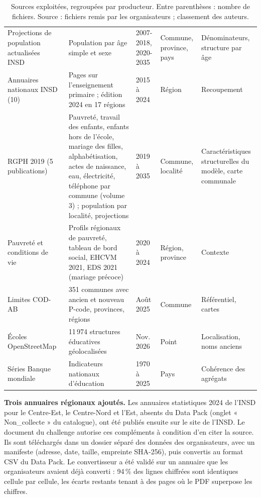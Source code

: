 \documentclass{article}
\begin{document}
\begin{table}[!t]
\begin{tabularx}{\textwidth}{@{}L{3.3cm} Y L{2.6cm} L{2.4cm} L{3.4cm}@{}}
Projections de population actualisées INSD~\cite{insd_projections} & Population par âge simple et sexe & 2007-2018, 2020-2035 & Commune, province, pays & Dénominateurs, structure par âge \\
Annuaires nationaux INSD (10)~\cite{insd_annuaires} & Pages sur l'enseignement primaire ; édition 2024 en 17 régions & 2015 à 2024 & Région & Recoupement \\
RGPH 2019 (5 publications)~\cite{insd_rgph} & Pauvreté, travail des enfants, enfants hors de l'école, mariage des filles, alphabétisation, actes de naissance, eau, électricité, téléphone par commune (volume 3) ; population par localité, projections & 2019 à 2035 & Commune, localité & Caractéristiques structurelles du modèle, carte communale \\
Pauvreté et conditions de vie~\cite{insd_pauvrete,ehcvm2021,eds2021} & Profils régionaux de pauvreté, tableau de bord social, EHCVM 2021, EDS 2021 (mariage précoce) & 2020 à 2024 & Région, province & Contexte \\
Limites COD-AB~\cite{codab} & 351 communes avec ancien et nouveau P-code, provinces, régions & Août 2025 & Commune & Référentiel, cartes \\
Écoles OpenStreetMap~\cite{hotosm} & 11\,974 structures éducatives géolocalisées & Nov. 2026 & Point & Localisation, noms anciens \\
Séries Banque mondiale~\cite{bm_unesco} & Indicateurs nationaux d'éducation & 1970 à 2025 & Pays & Cohérence des agrégats \\
\bottomrule
\end{tabularx}
\caption{Sources exploitées, regroupées par producteur. Entre parenthèses : nombre de fichiers. Source : fichiers remis par les organisateurs ; classement des auteurs.}
\label{tab:sources}
\end{table}

\textbf{Trois annuaires régionaux ajoutés.} Les annuaires statistiques 2024 de l'INSD pour le Centre-Est, le Centre-Nord et l'Est, absents du Data Pack (onglet « Non\_collecte » du catalogue), ont été publiés ensuite sur le site de l'INSD. Le document du challenge autorise ces compléments à condition d'en citer la source. Ils sont téléchargés dans un dossier séparé des données des organisateurs, avec un manifeste (adresse, date, taille, empreinte SHA-256), puis convertis au format CSV du Data Pack. Le convertisseur a été validé sur un annuaire que les organisateurs avaient déjà converti : 94\,\% des lignes chiffrées sont identiques cellule par cellule, les écarts restants tenant à des pages où le PDF superpose les chiffres.
\end{document}
